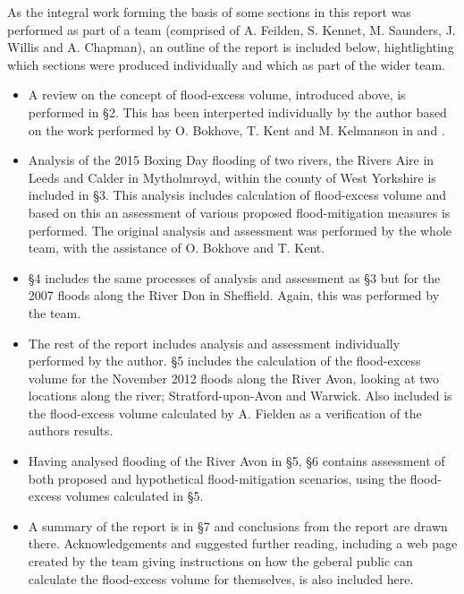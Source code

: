 \documentclass[11pt,a4paper]{article}
\begin{document}
As the integral work forming the basis of some sections in this report was performed as part of a team (comprised of A. Feilden, S. Kennet, M. Saunders, J. Willis and A. Chapman), an outline of the report is included below, hightlighting which sections were produced individually and which as part of the wider team.
\begin{framed}
\begin{itemize}
\item A review on the concept of flood-excess volume, introduced above, is performed in \S 2. This has been interperted individually by the author based on the work performed by O. Bokhove, T. Kent and M. Kelmanson in \cite{Aire} and \cite{Calder-Don}.
\item Analysis of the 2015 Boxing Day flooding of two rivers, the Rivers Aire in Leeds and Calder in Mytholmroyd, within the county of West Yorkshire is included in \S 3. This analysis includes calculation of flood-excess volume and based on this an assessment of various proposed flood-mitigation measures is performed. The original analysis and assessment was performed by the whole team, with the assistance of O. Bokhove and T. Kent.
\item \S 4 includes the same processes of analysis and assessment as \S 3 but for the 2007 floods along the River Don in Sheffield. Again, this was performed by the team.
\item The rest of the report includes analysis and assessment individually performed by the author. \S 5 includes the calculation of the flood-excess volume for the November 2012 floods along the River Avon, looking at two locations along the river{;} Stratford-upon-Avon and Warwick. Also included is the flood-excess volume calculated by A. Fielden as a verification of the authors results.
\item Having analysed flooding of the River Avon in \S 5, \S 6 contains assessment of both proposed and hypothetical flood-mitigation scenarios, using the flood-excess volumes calculated in \S 5.
\item A summary of the report is in \S 7 and conclusions from the report are drawn there. Acknowledgements and suggested further reading, including a web page created by the team giving instructions on how the geberal public can calculate the flood-excess volume for themselves, is also included here.
\end{itemize}
\end{framed}
\end{document}
